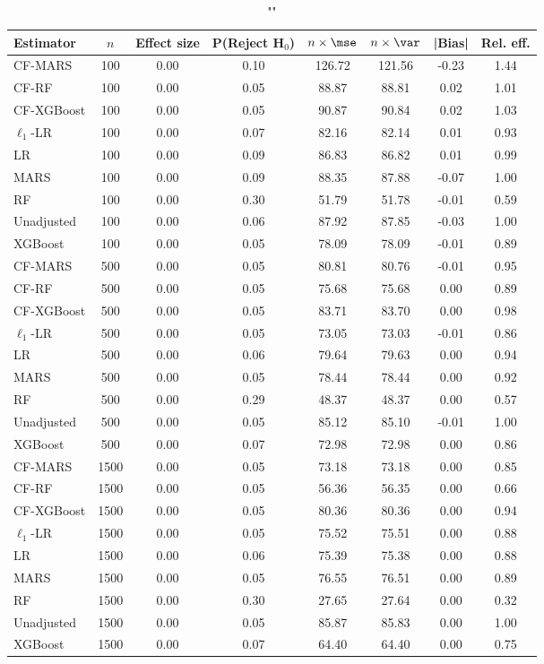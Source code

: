 \begin{table}
\centering
\caption{""}
\begin{tabular}{lccccccc}
\toprule
Estimator & $n$ & Effect size & P(Reject H$_0$) & $n\times\mse$ & $n\times \var$ & |Bias| & Rel. eff.\\ \midrule
CF-MARS & 100 & 0.00 & 0.10 & 126.72 & 121.56 & -0.23 & 1.44 \\ 
CF-RF & 100 & 0.00 & 0.05 &  88.87 &  88.81 &  0.02 & 1.01 \\ 
CF-XGBoost & 100 & 0.00 & 0.05 &  90.87 &  90.84 &  0.02 & 1.03 \\ 
$\ell_1$-LR & 100 & 0.00 & 0.07 &  82.16 &  82.14 &  0.01 & 0.93 \\ 
LR & 100 & 0.00 & 0.09 &  86.83 &  86.82 &  0.01 & 0.99 \\ 
MARS & 100 & 0.00 & 0.09 &  88.35 &  87.88 & -0.07 & 1.00 \\ 
RF & 100 & 0.00 & 0.30 &  51.79 &  51.78 & -0.01 & 0.59 \\ 
Unadjusted & 100 & 0.00 & 0.06 &  87.92 &  87.85 & -0.03 & 1.00 \\ 
XGBoost & 100 & 0.00 & 0.05 &  78.09 &  78.09 & -0.01 & 0.89 \\ \addlinespace 
CF-MARS & 500 & 0.00 & 0.05 &  80.81 &  80.76 & -0.01 & 0.95 \\ 
CF-RF & 500 & 0.00 & 0.05 &  75.68 &  75.68 &  0.00 & 0.89 \\ 
CF-XGBoost & 500 & 0.00 & 0.05 &  83.71 &  83.70 &  0.00 & 0.98 \\ 
$\ell_1$-LR & 500 & 0.00 & 0.05 &  73.05 &  73.03 & -0.01 & 0.86 \\ 
LR & 500 & 0.00 & 0.06 &  79.64 &  79.63 &  0.00 & 0.94 \\ 
MARS & 500 & 0.00 & 0.05 &  78.44 &  78.44 &  0.00 & 0.92 \\ 
RF & 500 & 0.00 & 0.29 &  48.37 &  48.37 &  0.00 & 0.57 \\ 
Unadjusted & 500 & 0.00 & 0.05 &  85.12 &  85.10 & -0.01 & 1.00 \\ 
XGBoost & 500 & 0.00 & 0.07 &  72.98 &  72.98 &  0.00 & 0.86 \\ \addlinespace 
CF-MARS & 1500 & 0.00 & 0.05 &  73.18 &  73.18 &  0.00 & 0.85 \\ 
CF-RF & 1500 & 0.00 & 0.05 &  56.36 &  56.35 &  0.00 & 0.66 \\ 
CF-XGBoost & 1500 & 0.00 & 0.05 &  80.36 &  80.36 &  0.00 & 0.94 \\ 
$\ell_1$-LR & 1500 & 0.00 & 0.05 &  75.52 &  75.51 &  0.00 & 0.88 \\ 
LR & 1500 & 0.00 & 0.06 &  75.39 &  75.38 &  0.00 & 0.88 \\ 
MARS & 1500 & 0.00 & 0.05 &  76.55 &  76.51 &  0.00 & 0.89 \\ 
RF & 1500 & 0.00 & 0.30 &  27.65 &  27.64 &  0.00 & 0.32 \\ 
Unadjusted & 1500 & 0.00 & 0.05 &  85.87 &  85.83 &  0.00 & 1.00 \\ 
XGBoost & 1500 & 0.00 & 0.07 &  64.40 &  64.40 &  0.00 & 0.75 \\
\bottomrule
\end{tabular}
\end{table}

